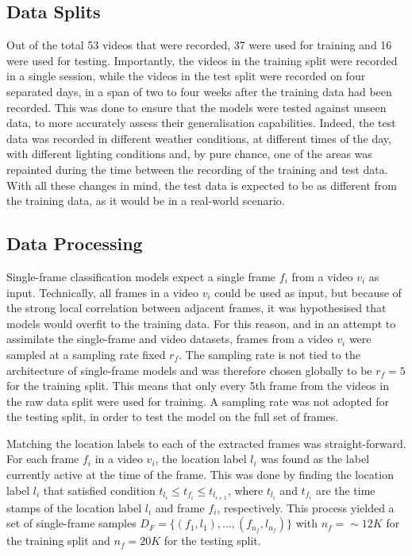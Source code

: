 \documentclass[a4paper]{article}
\begin{document}
\subsection{Data Splits} %
\label{sub:data-splits}

Out of the total 53 videos that were recorded, 37 were used for training and 16
were used for testing. Importantly, the videos in the training split were
recorded in a single session, while the videos in the test split were recorded
on four separated days, in a span of two to four weeks after the training data
had been recorded. This was done to ensure that the models were tested against
unseen data, to more accurately assess their generalisation capabilities.
Indeed, the test data was recorded in different weather conditions, at different
times of the day, with different lighting conditions and, by pure chance, one of
the areas was repainted during the time between the recording of the training
and test data. With all these changes in mind, the test data is expected to be
as different from the training data, as it would be in a real-world scenario.


\subsection{Data Processing} %
\label{sub:data-processing}

Single-frame classification models expect a single frame $f_i$ from a video
$v_i$ as input. Technically, all frames in a video $v_i$ could be used as input,
but because of the strong local correlation between adjacent frames, it was
hypothesised that models would overfit to the training data. For this reason,
and in an attempt to assimilate the single-frame and video datasets, frames from
a video $v_i$ were sampled at a sampling rate fixed $r_f$. The sampling rate is
not tied to the architecture of single-frame models and was therefore chosen
globally to be $r_f=5$ for the training split. This means that only every 5th
frame from the videos in the raw data split were used for training. A sampling
rate was not adopted for the testing split, in order to test the model on the
full set of frames.

Matching the location labels to each of the extracted frames was
straight-forward. For each frame $f_i$ in a video $v_i$, the location label
$l_i$ was found as the label currently active at the time of the frame. This was
done by finding the location label $l_i$ that satisfied condition $t_{l_i} \leq
t_{f_i} \leq t_{l_{i+1}}$, where $t_{l_i}$ and $t_{f_i}$ are the time stamps of
the location label $l_i$ and frame $f_i$, respectively. This process yielded a
set of single-frame samples $D_F = \{(f_1, l_1), ..., (f_{n_f}, l_{n_f})\}$ with
$n_f=\sim 12K$ for the training split and $n_f=20K$ for the testing split.
\end{document}
